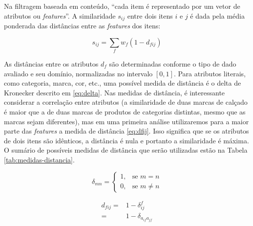 Na filtragem baseada em conteúdo, ``cada item é representado por um vetor de atributos ou \textit{features}''. A similaridade $s_{ij}$ entre dois itens $i$ e $j$ é dada pela média ponderada das distâncias entre as \textit{features} dos itens:

\begin{equation} 
\label{eq:sij}
    s_{ij} = \sum_{f}{w_{f} \left(1-d_{fij}\right)}
\end{equation}

As distâncias entre os atributos $d_f$ são determinadas conforme o tipo de dado avaliado e seu domínio, normalizadas no intervalo $\left[0,1\right]$. Para atributos literais, como categoria, marca, cor, etc., uma possível medida de distância é o delta de Kronecker descrito em \ref{eq:delta}. Nas medidas de distância, é interessante considerar a correlação entre atributos (a similaridade de duas marcas de calçado é maior que a de duas marcas de produtos de categorias distintas, mesmo que as marcas sejam diferentes), mas em uma primeira análise utilizaremos para a maior parte das \textit{features} a medida de distância \ref{eq:dfij}. Isso significa que se os atributos de dois itens são idênticos, a distância é nula e portanto a similaridade é máxima. O sumário de possíveis medidas de distância que serão utilizadas estão na Tabela \ref{tab:medidas-distancia}.

\begin{equation}
\label{eq:delta}
\delta_{mn} = 
\begin{cases}
1, &\text{se }m=n \\
0, &\text{se }m \neq n
\end{cases} 
\end{equation}

\begin{equation}
\label{eq:dfij}
\begin{split}
d_{fij} =& 1-\delta_{ij}^f \\
    =& 1-\delta_{a_{if} a_{jf}}
\end{split} 
\end{equation}

